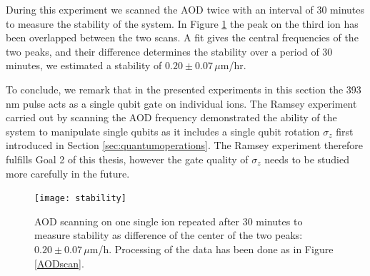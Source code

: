 During this experiment we scanned the AOD twice with an interval of 30 minutes to measure the stability of the system. In Figure \ref{fig:stability} the peak on the third ion has been overlapped between the two scans. A fit gives the central frequencies of the two peaks, and their difference determines the stability over a period of 30 minutes, we estimated a stability of $0.20\pm 0.07\,\mu$m/hr.\par
To conclude, we remark that in the presented experiments in this section the 393 nm pulse acts as a single qubit gate on individual ions. The Ramsey experiment carried out by scanning the AOD frequency demonstrated the ability of the system to manipulate single qubits as it includes a single qubit rotation $\sigma_z$ first introduced in Section \ref{sec:quantumoperations}. The Ramsey experiment therefore fulfills Goal 2 of this thesis, however the gate quality of $\sigma_z$ needs to be studied more carefully in the future.
\begin{figure}
\centering
\texttt{[image: stability]}
\caption{AOD scanning on one single ion repeated after 30 minutes to measure stability as difference of the center of the two peaks: $0.20\pm 0.07\,\mu$m/h. Processing of the data has been done as in Figure \ref{AODscan}.}
\label{fig:stability}
\end{figure}
